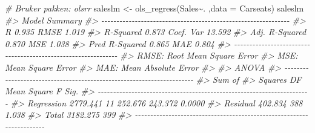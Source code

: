\documentclass[
]{article}
\newenvironment{Shaded}{\begin{snugshade}}{\end{snugshade}}
\newcommand{\AttributeTok}[1]{\textcolor[rgb]{0.77,0.63,0.00}{#1}}
\newcommand{\CommentTok}[1]{\textcolor[rgb]{0.56,0.35,0.01}{\textit{#1}}}
\newcommand{\FunctionTok}[1]{\textcolor[rgb]{0.00,0.00,0.00}{#1}}
\newcommand{\NormalTok}[1]{#1}
\newcommand{\OtherTok}[1]{\textcolor[rgb]{0.56,0.35,0.01}{#1}}
\newcommand{\SpecialCharTok}[1]{\textcolor[rgb]{0.00,0.00,0.00}{#1}}
\begin{document}
\begin{Shaded}
\begin{Highlighting}[]
\CommentTok{\# Bruker pakken: olsrr}
\NormalTok{saleslm }\OtherTok{\textless{}{-}} \FunctionTok{ols\_regress}\NormalTok{(Sales}\SpecialCharTok{\textasciitilde{}}\NormalTok{. ,}\AttributeTok{data =}\NormalTok{ Carseats)}
\NormalTok{saleslm}
\CommentTok{\#\textgreater{}                         Model Summary                          }
\CommentTok{\#\textgreater{} {-}{-}{-}{-}{-}{-}{-}{-}{-}{-}{-}{-}{-}{-}{-}{-}{-}{-}{-}{-}{-}{-}{-}{-}{-}{-}{-}{-}{-}{-}{-}{-}{-}{-}{-}{-}{-}{-}{-}{-}{-}{-}{-}{-}{-}{-}{-}{-}{-}{-}{-}{-}{-}{-}{-}{-}{-}{-}{-}{-}{-}{-}}
\CommentTok{\#\textgreater{} R                       0.935       RMSE                1.019 }
\CommentTok{\#\textgreater{} R{-}Squared               0.873       Coef. Var          13.592 }
\CommentTok{\#\textgreater{} Adj. R{-}Squared          0.870       MSE                 1.038 }
\CommentTok{\#\textgreater{} Pred R{-}Squared          0.865       MAE                 0.804 }
\CommentTok{\#\textgreater{} {-}{-}{-}{-}{-}{-}{-}{-}{-}{-}{-}{-}{-}{-}{-}{-}{-}{-}{-}{-}{-}{-}{-}{-}{-}{-}{-}{-}{-}{-}{-}{-}{-}{-}{-}{-}{-}{-}{-}{-}{-}{-}{-}{-}{-}{-}{-}{-}{-}{-}{-}{-}{-}{-}{-}{-}{-}{-}{-}{-}{-}{-}}
\CommentTok{\#\textgreater{}  RMSE: Root Mean Square Error }
\CommentTok{\#\textgreater{}  MSE: Mean Square Error }
\CommentTok{\#\textgreater{}  MAE: Mean Absolute Error }
\CommentTok{\#\textgreater{} }
\CommentTok{\#\textgreater{}                                 ANOVA                                  }
\CommentTok{\#\textgreater{} {-}{-}{-}{-}{-}{-}{-}{-}{-}{-}{-}{-}{-}{-}{-}{-}{-}{-}{-}{-}{-}{-}{-}{-}{-}{-}{-}{-}{-}{-}{-}{-}{-}{-}{-}{-}{-}{-}{-}{-}{-}{-}{-}{-}{-}{-}{-}{-}{-}{-}{-}{-}{-}{-}{-}{-}{-}{-}{-}{-}{-}{-}{-}{-}{-}{-}{-}{-}{-}{-}}
\CommentTok{\#\textgreater{}                 Sum of                                                }
\CommentTok{\#\textgreater{}                Squares         DF    Mean Square       F         Sig. }
\CommentTok{\#\textgreater{} {-}{-}{-}{-}{-}{-}{-}{-}{-}{-}{-}{-}{-}{-}{-}{-}{-}{-}{-}{-}{-}{-}{-}{-}{-}{-}{-}{-}{-}{-}{-}{-}{-}{-}{-}{-}{-}{-}{-}{-}{-}{-}{-}{-}{-}{-}{-}{-}{-}{-}{-}{-}{-}{-}{-}{-}{-}{-}{-}{-}{-}{-}{-}{-}{-}{-}{-}{-}{-}{-}}
\CommentTok{\#\textgreater{} Regression    2779.441         11        252.676    243.372    0.0000 }
\CommentTok{\#\textgreater{} Residual       402.834        388          1.038                      }
\CommentTok{\#\textgreater{} Total         3182.275        399                                     }
\CommentTok{\#\textgreater{} {-}{-}{-}{-}{-}{-}{-}{-}{-}{-}{-}{-}{-}{-}{-}{-}{-}{-}{-}{-}{-}{-}{-}{-}{-}{-}{-}{-}{-}{-}{-}{-}{-}{-}{-}{-}{-}{-}{-}{-}{-}{-}{-}{-}{-}{-}{-}{-}{-}{-}{-}{-}{-}{-}{-}{-}{-}{-}{-}{-}{-}{-}{-}{-}{-}{-}{-}{-}{-}{-}}

\end{Highlighting}
\end{Shaded}
\end{document}
